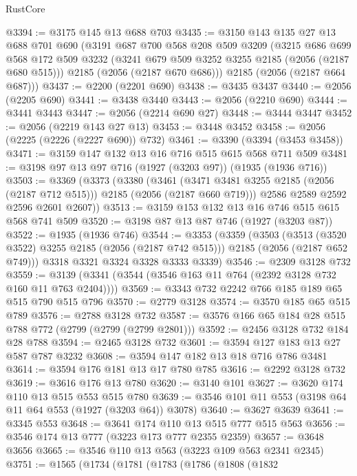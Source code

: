 \begin{lexlean}{RustCore}
\begin{coremodule}
@3394 := @3175 @145 @13 @688 @703
@3435 := @3150
    @143
    @135
    @27
    @13
    @688
    @701
    @690
    (@3191
      @687
      @700
      @568
      @208
      @509
      @3209
      (@3215
        @686
        @699
        @568
        @172
        @509
        @3232
        (@3241 @679 @509 @3252 @3255 @2185 (@2056 (@2187 @680 @515)))
        @2185
        (@2056 (@2187 @670 @686)))
      @2185
      (@2056 (@2187 @664 @687)))
@3437 := @2200 (@2201 @690)
@3438 := @3435 @3437
@3440 := @2056 (@2205 @690)
@3441 := @3438 @3440
@3443 := @2056 (@2210 @690)
@3444 := @3441 @3443
@3447 := @2056 (@2214 @690 @27)
@3448 := @3444 @3447
@3452 := @2056 (@2219 @143 @27 @13)
@3453 := @3448 @3452
@3458 := @2056 (@2225 (@2226 (@2227 @690)) @732)
@3461 := @3390 (@3394 (@3453 @3458))
@3471 := @3159 @147 @132 @13 @16 @716 @515 @615 @568 @711 @509
@3481 := @3198 @97 @13 @97 @716 (@1927 (@3203 @97)) (@1935 (@1936 @716))
@3503 := @3369
    (@3373
      (@3380
        (@3461 (@3471 @3481 @3255 @2185 (@2056 (@2187 @712 @515))) @2185 (@2056 (@2187 @660 @719)))
        @2586
        @2589
        @2592
        @2596
        @2601
        @2607))
@3513 := @3159 @153 @132 @13 @16 @746 @515 @615 @568 @741 @509
@3520 := @3198 @87 @13 @87 @746 (@1927 (@3203 @87))
@3522 := @1935 (@1936 @746)
@3544 := @3353
    (@3359
      (@3503
        (@3513 (@3520 @3522) @3255 @2185 (@2056 (@2187 @742 @515)))
        @2185
        (@2056 (@2187 @652 @749)))
      @3318
      @3321
      @3324
      @3328
      @3333
      @3339)
@3546 := @2309 @3128 @732
@3559 := @3139 (@3341 (@3544 (@3546 @163 @11 @764 (@2392 @3128 @732 @160 @11 @763 @2404))))
@3569 := @3343 @732 @2242 @766 @185 @189 @65 @515 @790 @515 @796
@3570 := @2779 @3128
@3574 := @3570 @185 @65 @515 @789
@3576 := @2788 @3128 @732
@3587 := @3576 @166 @65 @184 @28 @515 @788 @772 (@2799 (@2799 (@2799 @2801)))
@3592 := @2456 @3128 @732 @184 @28 @788
@3594 := @2465 @3128 @732
@3601 := @3594 @127 @183 @13 @27 @587 @787 @3232
@3608 := @3594 @147 @182 @13 @18 @716 @786 @3481
@3614 := @3594 @176 @181 @13 @17 @780 @785
@3616 := @2292 @3128 @732
@3619 := @3616 @176 @13 @780
@3620 := @3140 @101
@3627 := @3620 @174 @110 @13 @515 @553 @515 @780
@3639 := @3546 @101 @11 @553 (@3198 @64 @11 @64 @553 (@1927 (@3203 @64)) @3078)
@3640 := @3627 @3639
@3641 := @3345 @553
@3648 := @3641 @174 @110 @13 @515 @777 @515 @563
@3656 := @3546 @174 @13 @777 (@3223 @173 @777 @2355 @2359)
@3657 := @3648 @3656
@3665 := @3546 @110 @13 @563 (@3223 @109 @563 @2341 @2345)
@3751 := @1565
    (@1734
      (@1781
        (@1783
          (@1786
            (@1808
              (@1832

\end{coremodule}
\end{lexlean}
